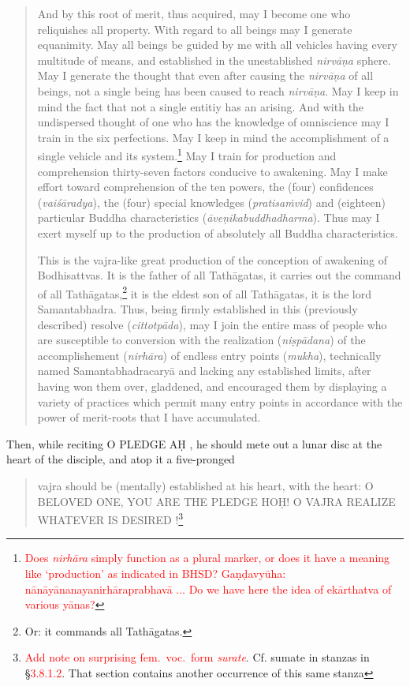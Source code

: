 \documentclass[11pt]{book}
\makeatletter
\def\fakesc#1{%
  \begingroup%
  \xdef\fake@name{\csname\curr@fontshape/\f@size\endcsname}%
  \fontsize{1.3\fontdimen8\fake@name}{\baselineskip}\selectfont%
  \uppercase{#1}%
  \endgroup%
}
\newcommand{\mantra}[1]{\fakesc{#1}}
\newcommand{\red}[1]{\textcolor{red}{#1}}
\newcommand{\skt}[1]{\emph{#1}}
\makeatother
\begin{document}
\begin{quote}
	And by this root of merit, thus acquired, %
	 may I become one who reliquishes all property. With regard to all beings may I generate equanimity. May all beings be guided by me with all vehicles having every multitude of means, and established in the unestablished \skt{nirvāṇa} sphere. May I generate the thought that even after causing the \skt{nirvāṇa} of all beings, not a single being has been caused to reach \skt{nirvāṇa}. May I keep in mind the fact that not a single entitiy has an arising. And with the undispersed thought of one who has the knowledge of omniscience may I train in the six perfections. May I keep in mind the accomplishment of a single vehicle and its system.\footnote{\red{Does \skt{nirhāra} simply function as a plural marker, or does it have a meaning like `production' as indicated in BHSD? Gaṇḍavyūha: nānāyānanayanirhāraprabhavā ... Do we have here the idea of ekārthatva of various yānas?}} May I train for production and comprehension thirty-seven factors conducive to awakening. May I make effort toward comprehension of the ten powers, the (four) confidences (\skt{vaiśāradya}), the (four) special knowledges (\skt{pratisaṁvid}) and (eighteen) particular Buddha characteristics (\skt{āveṇikabuddhadharma}). Thus may I exert myself up to the production of absolutely all Buddha characteristics.
	
	This is the vajra-like great production of the conception of awakening of Bodhisattvas. It is the father of all Tathāgatas, it carries out the command of all Tathāgatas,\footnote{Or: it commands all Tathāgatas.} it is the eldest son of all Tathāgatas, it is the lord Samantabhadra. Thus, being firmly established in this (previously described) resolve (\skt{cittotpāda}), may I join the entire mass of people who are susceptible to conversion with the realization (\skt{niṣpādana}) of the accomplishement (\skt{nirhāra}) of endless entry points (\skt{mukha}), technically named Samantabhadracaryā and lacking any established limits, after having won them over, gladdened, and encouraged them by displaying a variety of practices which permit many entry points in accordance with the power of merit-roots that I have accumulated.
\end{quote}

Then, while reciting \mantra{o pledge aḥ}, he should mete out a lunar disc at the heart of the disciple, and atop it a five-pronged

\begin{verse}
vajra should be (mentally) established at his heart, with the heart: \mantra{o beloved one, you are the pledge hoḥ! o vajra realize whatever is desired}!\footnote{\red{Add note on surprising fem.\ voc.\ form \skt{surate}}. Cf. sumate in stanzas in §\red{3.8.1.2}. That section contains another occurrence of this same stanza}
\end{verse}
\end{document}
